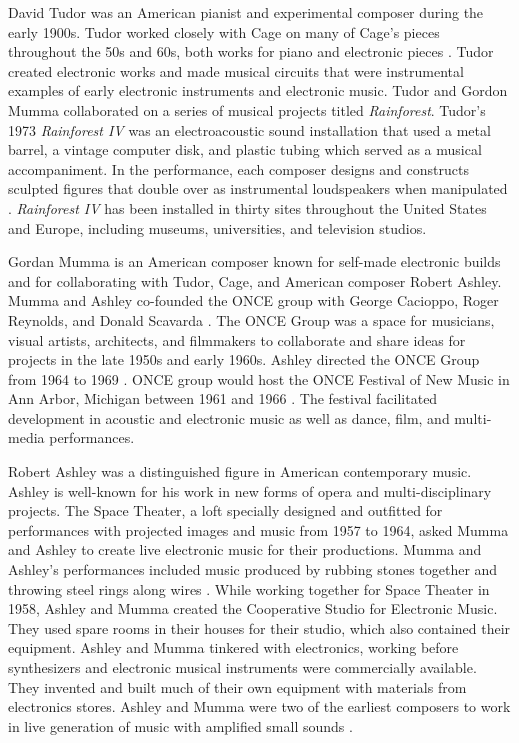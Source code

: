 \documentclass[letterpaper, 12pt]{article}
\begin{document}
%
David Tudor was an American pianist and experimental composer during the early 1900s.
%
Tudor worked closely with Cage on many of Cage's pieces throughout the 50s and 60s, both works for piano and electronic pieces \citep{newworldrecords2006david}.
%
Tudor created electronic works and made musical circuits that were instrumental examples of early electronic instruments and electronic music.
%
Tudor and Gordon Mumma collaborated on a series of musical projects titled \textit{Rainforest}.
%
Tudor's 1973 \textit{Rainforest IV} was an electroacoustic sound installation that used a metal barrel, a vintage computer disk, and plastic tubing which served as a musical accompaniment.
%
In the performance, each composer designs and constructs sculpted figures that double over as instrumental loudspeakers when manipulated \citep{newworldrecords2006david}.
%
\textit{Rainforest IV} has been installed in thirty sites throughout the United States and Europe, including museums, universities, and television studios.


%
Gordan Mumma is an American composer known for self-made electronic builds and for collaborating with Tudor, Cage, and American composer Robert Ashley.
%
Mumma and Ashley co-founded the ONCE group with George Cacioppo, Roger Reynolds, and Donald Scavarda \citep{newworldrecords2006david}.
%
The ONCE Group was a space for musicians, visual artists, architects, and filmmakers to collaborate and share ideas for projects in the late 1950s and early 1960s.
%
Ashley directed the ONCE Group from 1964 to 1969 \citep{ashley2017biography}.
%
ONCE group would host the ONCE Festival of New Music in Ann Arbor, Michigan between 1961 and 1966 \citep{newworldrecords2006david}.
%
The festival facilitated development in acoustic and electronic music as well as dance, film, and multi-media performances.


%
Robert Ashley was a distinguished figure in American contemporary music.
%
Ashley is well-known for his work in new forms of opera and multi-disciplinary projects.
%
The Space Theater, a loft specially designed and outfitted for performances with projected images and music from 1957 to 1964, asked  Mumma and Ashley to create live electronic music for their productions.
%
Mumma and Ashley's performances included music produced by rubbing stones together and throwing steel rings along wires \citep{holmes2002electronic}.
%
While working together for Space Theater in 1958, Ashley and Mumma created the Cooperative Studio for Electronic Music.
%
They used spare rooms in their houses for their studio, which also contained their equipment.
%
Ashley and Mumma tinkered with electronics, working before synthesizers and electronic musical instruments were commercially available.
%
They invented and built much of their own equipment with materials from electronics stores.
%
Ashley and Mumma were two of the earliest composers to work in live generation of music with amplified small sounds \citep{holmes2002electronic}.
\end{document}
